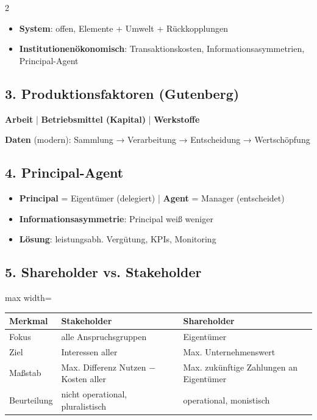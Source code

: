 \documentclass[10pt, a4paper]{article}
\begin{document}
\begin{multicols}{2}
\begin{itemize}
  \item \textbf{System}: offen, Elemente + Umwelt + Rückkopplungen
  \item \textbf{Institutionenökonomisch}: Transaktionskosten, Informationsasymmetrien, Principal-Agent
\end{itemize}


\subsection{3. Produktionsfaktoren (Gutenberg)}

\textbf{Arbeit} | \textbf{Betriebsmittel (Kapital)} | \textbf{Werkstoffe}

\textbf{Daten} (modern): Sammlung → Verarbeitung → Entscheidung → Wertschöpfung



\subsection{4. Principal-Agent}

\begin{itemize}
  \item \textbf{Principal} = Eigentümer (delegiert) | \textbf{Agent} = Manager (entscheidet)
  \item \textbf{Informationsasymmetrie}: Principal weiß weniger
  \item \textbf{Lösung}: leistungsabh. Vergütung, KPIs, Monitoring
\end{itemize}


\subsection{5. Shareholder vs. Stakeholder}


{\small
\begin{adjustbox}{max width=\linewidth}
{\scriptsize
\begin{tabular}{lll}
\toprule
\textbf{Merkmal} & \textbf{Stakeholder} & \textbf{Shareholder} \\
\midrule
Fokus & alle Anspruchsgruppen & Eigentümer \\
Ziel & Interessen aller & Max. Unternehmenswert \\
Maßstab & Max. Differenz Nutzen − Kosten aller & Max. zukünftige Zahlungen an Eigentümer \\
Beurteilung & nicht operational, pluralistisch & operational, monistisch \\
\bottomrule
\end{tabular}
}
\end{adjustbox}
}




\end{multicols}
\end{document}
